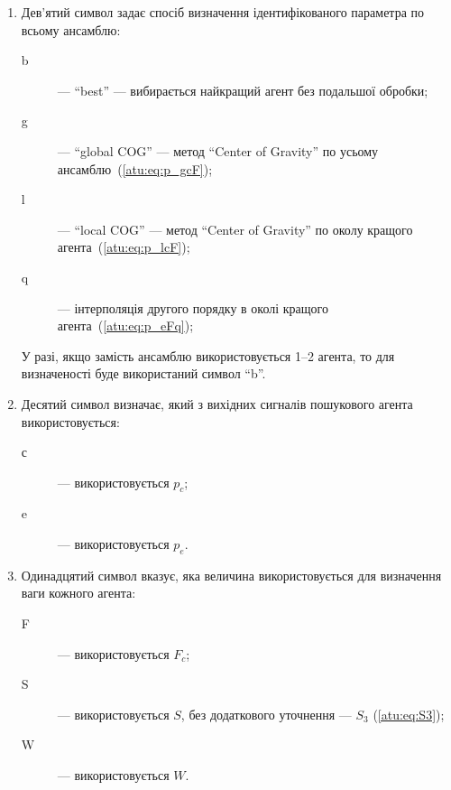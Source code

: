 \begin{enumerate}
  \item
     Дев'ятий символ задає спосіб визначення ідентифікованого параметра по всьому ансамблю:
    \begin{description}

      \item[b]  --- ``best'' ---
        вибирається найкращий агент без подальшої обробки;

      \item[g]  --- ``global COG'' ---
        метод ``Center of Gravity'' по усьому ансамблю~(\ref{atu:eq:p_gcF});

      \item[l] --- ``local COG'' ---
        метод ``Center of Gravity'' по околу кращого агента~(\ref{atu:eq:p_lcF});

      \item[q] ---
        інтерполяція другого порядку в околі кращого агента~(\ref{atu:eq:p_eFq});

    \end{description}

  У разі, якщо замість ансамблю використовується 1--2 агента, то
  для визначеності буде використаний символ ``b''.


  \item
     Десятий символ визначає, який з вихідних сигналів пошукового агента використовується:
    \begin{description}

      \item[с]  ---  використовується $p_c$;

      \item[e]  --- використовується $p_e$.

    \end{description}

  \item
    Одинадцятий символ вказує,
    яка величина використовується для визначення ваги кожного агента:
    \begin{description}

      \item[F]  ---
        використовується $ F_c $;

      \item[S]  ---
        використовується $ S $, без додаткового уточнення --- $ S_{3} $ (\ref{atu:eq:S3});

      \item[W]  ---
        використовується $ W $.

    \end{description}


\end{enumerate}

